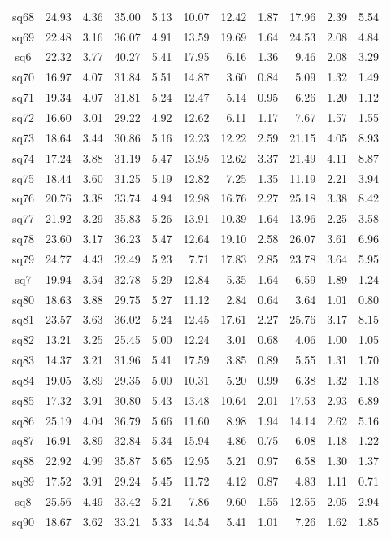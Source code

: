{\begin{longtable}{@{}cr@{\hspace{1em}}r@{\hspace{1em}}r@{\hspace{1em}}r@{\hspace{1em}}r@{\hspace{2em}}r@{\hspace{1em}}r@{\hspace{1em}}r@{\hspace{1em}}r@{\hspace{1em}}r@{}}
sq68&24.93&4.36&35.00&5.13&10.07&12.42&1.87&17.96&2.39&5.54\\
sq69&22.48&3.16&36.07&4.91&13.59&19.69&1.64&24.53&2.08&4.84\\
sq6&22.32&3.77&40.27&5.41&17.95&6.16&1.36&9.46&2.08&3.29\\
sq70&16.97&4.07&31.84&5.51&14.87&3.60&0.84&5.09&1.32&1.49\\
sq71&19.34&4.07&31.81&5.24&12.47&5.14&0.95&6.26&1.20&1.12\\
sq72&16.60&3.01&29.22&4.92&12.62&6.11&1.17&7.67&1.57&1.55\\
sq73&18.64&3.44&30.86&5.16&12.23&12.22&2.59&21.15&4.05&8.93\\
sq74&17.24&3.88&31.19&5.47&13.95&12.62&3.37&21.49&4.11&8.87\\
sq75&18.44&3.60&31.25&5.19&12.82&7.25&1.35&11.19&2.21&3.94\\
sq76&20.76&3.38&33.74&4.94&12.98&16.76&2.27&25.18&3.38&8.42\\
sq77&21.92&3.29&35.83&5.26&13.91&10.39&1.64&13.96&2.25&3.58\\
sq78&23.60&3.17&36.23&5.47&12.64&19.10&2.58&26.07&3.61&6.96\\
sq79&24.77&4.43&32.49&5.23&7.71&17.83&2.85&23.78&3.64&5.95\\
sq7&19.94&3.54&32.78&5.29&12.84&5.35&1.64&6.59&1.89&1.24\\
sq80&18.63&3.88&29.75&5.27&11.12&2.84&0.64&3.64&1.01&0.80\\
sq81&23.57&3.63&36.02&5.24&12.45&17.61&2.27&25.76&3.17&8.15\\
sq82&13.21&3.25&25.45&5.00&12.24&3.01&0.68&4.06&1.00&1.05\\
sq83&14.37&3.21&31.96&5.41&17.59&3.85&0.89&5.55&1.31&1.70\\
sq84&19.05&3.89&29.35&5.00&10.31&5.20&0.99&6.38&1.32&1.18\\
sq85&17.32&3.91&30.80&5.43&13.48&10.64&2.01&17.53&2.93&6.89\\
sq86&25.19&4.04&36.79&5.66&11.60&8.98&1.94&14.14&2.62&5.16\\
sq87&16.91&3.89&32.84&5.34&15.94&4.86&0.75&6.08&1.18&1.22\\
sq88&22.92&4.99&35.87&5.65&12.95&5.21&0.97&6.58&1.30&1.37\\
sq89&17.52&3.91&29.24&5.45&11.72&4.12&0.87&4.83&1.11&0.71\\
sq8&25.56&4.49&33.42&5.21&7.86&9.60&1.55&12.55&2.05&2.94\\
sq90&18.67&3.62&33.21&5.33&14.54&5.41&1.01&7.26&1.62&1.85\\

\end{longtable}}
